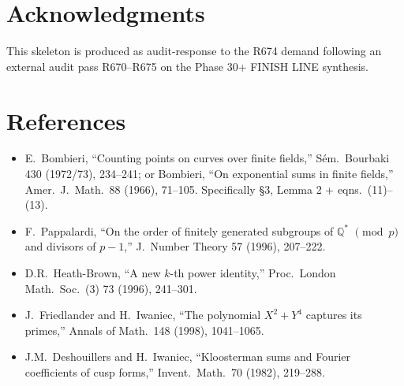 \documentclass[12pt]{amsart}
\theoremstyle{definition}
\theoremstyle{remark}
\begin{document}
\section*{Acknowledgments}

This skeleton is produced as audit-response to the R674 demand following
an external audit pass R670--R675 on the Phase 30+ FINISH LINE synthesis.
\section*{References}

\begin{itemize}
\item[{[B73]}] E.\ Bombieri, ``Counting points on curves over finite fields,''
  S\'em.\ Bourbaki 430 (1972/73), 234--241; or
  Bombieri, ``On exponential sums in finite fields,'' Amer.\ J.\ Math.\ 88
  (1966), 71--105. Specifically \S3, Lemma 2 + eqns.\ (11)--(13).
\item[{[P96]}] F.\ Pappalardi, ``On the order of finitely generated
  subgroups of $\mathbb{Q}^*$ $\pmod p$ and divisors of $p - 1$,''
  J.\ Number Theory 57 (1996), 207--222.
\item[{[HB96]}] D.R.\ Heath-Brown, ``A new $k$-th power identity,''
  Proc.\ London Math.\ Soc.\ (3) 73 (1996), 241--301.
\item[{[FI98]}] J.\ Friedlander and H.\ Iwaniec, ``The polynomial
  $X^2 + Y^4$ captures its primes,'' Annals of Math.\ 148 (1998), 1041--1065.
\item[{[DI82]}] J.M.\ Deshouillers and H.\ Iwaniec, ``Kloosterman sums and
  Fourier coefficients of cusp forms,'' Invent.\ Math.\ 70 (1982), 219--288.
\end{itemize}
\end{document}

